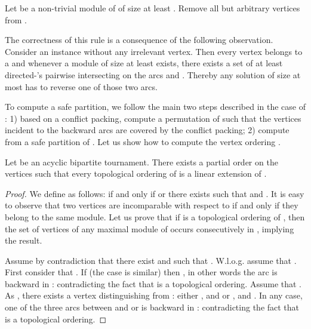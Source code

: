 \begin{polyrule} \label{rule:modulesfasbt}
Let  be a non-trivial module of  of size at least . Remove all but  arbitrary vertices from . 
\end{polyrule}

The correctness of this rule is a consequence of the following observation. Consider an instance without any irrelevant vertex. Then every vertex belongs to a  and whenever a module  of size at least  exists, there exists a set  of at least  directed-'s pairwise intersecting on the arcs  and . Thereby any solution of size at most  has to reverse one of those two arcs.

To compute a safe partition, we follow the main two steps described in the case of \FAST{}: 1) based on a conflict packing, compute a permutation  of  such that the vertices incident to the backward arcs are covered by the conflict packing; 2) compute from  a safe partition of . Let us show how to compute the vertex ordering .

\begin{lemma} \label{lem:module-ordering}
Let  be an acyclic bipartite tournament. There exists a partial order  on the vertices such that every topological ordering  of  is a linear extension of .
\end{lemma}
\begin{proof}
We define  as follows:  if and only if  or there exists  such that  and . It is easy to observe that two vertices are incomparable with respect to  if and only if they belong to the same module. Let us prove that if  is a topological ordering of , then the set of vertices of any maximal module  of  occurs consecutively in , implying the result.

Assume by contradiction that there exist  and  such that . W.l.o.g. assume that . First consider that . If   (the case   is similar) then , in other words the arc  is backward in : contradicting the fact that  is a topological ordering. Assume that . As , there exists a vertex  distinguishing  from : either ,  and  or ,  and . In any case, one of the three arcs between  and  or  is backward in : contradicting the fact that  is a topological ordering.
\end{proof}





